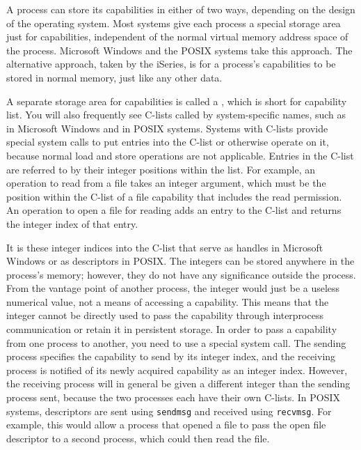 A process can store its capabilities in either of two ways, depending
on the design of the operating system.  Most systems give each process
a special storage area just for capabilities, independent of the
normal virtual memory address space of the process.  Microsoft Windows
and the POSIX systems take this approach.  The alternative approach,
taken by the iSeries, is for a process's capabilities to be stored in normal
memory, just like any other data.

A separate storage area for capabilities is called a ,
which is
short for capability list.  You will also frequently see C-lists called by system-specific
names, such as  in Microsoft Windows
and  in POSIX systems.  Systems with C-lists provide special
system calls to put entries into the C-list or otherwise operate on
it, because normal load and store operations are not applicable.
Entries in the C-list are referred to by their integer positions within
the list.  For example, an operation to read from a file takes
an integer argument, which must be the position within the C-list of a
file capability that includes the read permission.  An operation to open a
file for reading adds an entry to the C-list and returns the integer
index of that entry.

It is these integer indices into the C-list that serve as handles in
Microsoft Windows or as descriptors in POSIX.  The integers can be stored
anywhere in the process's memory; however, they do not have any
significance outside the process.  From the vantage point of 
another process, the integer would just be a useless numerical value, not
a means of accessing a capability.  This means that the integer
cannot be directly used to pass the capability through
interprocess communication or retain it in persistent storage.  In order to
pass a capability from one process to another, you need to use a
special system call.  The sending process specifies the capability to
send by its integer index, and the receiving process is notified of
its newly acquired capability as an integer index.  However, the
receiving process will in general be given a different integer than
the sending process sent, because the two processes each have their own
C-lists.  In POSIX systems, descriptors are sent using
\verb|sendmsg| and received using
\verb|recvmsg|.  For example, this
would allow a process that opened a file to pass the open file descriptor
to a second process, which could then read the file.

